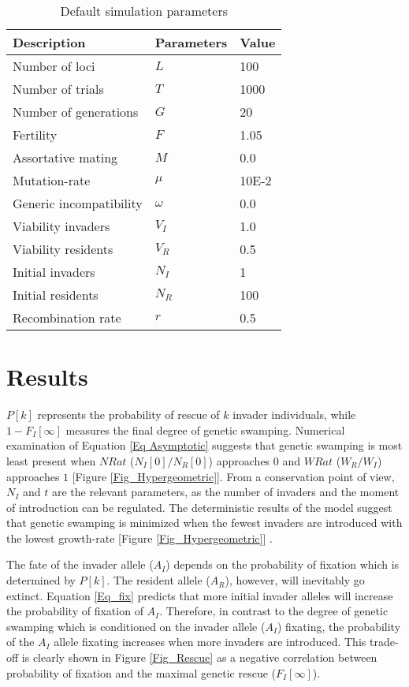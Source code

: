 \documentclass[a4paper,10pt]{article}
\begin{document}
	\begin{table}[]
		\centering
		\caption{Default simulation parameters}
		\label{Table_ParamSim}
		\begin{tabular}{lll}
			\textbf{Description}	& \textbf{Parameters}		& \textbf{Value} 	\\ \hline
			Number of loci 			& $L$			& 100 		\\ 
			Number of trials 		& $T$ 			& 1000		\\
			Number of generations 	& $G$			& 20		\\ 
			Fertility 				& $F$ 			& 1.05  	\\ \hline
			Assortative mating		& $M$ 			& 0.0 		\\  
			Mutation-rate 			& $\mu$			& 10E-2		\\
			Generic incompatibility	& $\omega$ 		& 0.0		\\
			Viability invaders		& $V_I$			& 1.0		\\
			Viability residents		& $V_R$			& 0.5 		\\
			Initial invaders		& $N_I$			& 1 		\\
			Initial residents		& $N_R$			& 100 		\\
			Recombination rate		& $r$ 			& 0.5 		\\
			
		\end{tabular}
	\end{table}

	\section*{Results}
	
	$P[k]$ represents the probability of rescue of $k$ invader individuals, while $1-F_I[\infty]$ measures the final degree of genetic swamping. Numerical examination of Equation \ref{Eq Asymptotic} suggests that genetic swamping is most least present when $NRat$ ($N_I[0]/N_R[0]$) approaches $0$ and $WRat$ ($W_R/W_I$) approaches $1$ [Figure \ref{Fig_Hypergeometric}]. From a conservation point of view, $N_I$ and $t$ are the relevant parameters, as the number of invaders and the moment of introduction can be regulated. The deterministic results of the model suggest that genetic swamping is minimized when the fewest invaders are introduced with the lowest growth-rate [Figure \ref{Fig_Hypergeometric}] . 
	
	The fate of the invader allele ($A_I$) depends on the probability of fixation which is determined by $P[k]$. The resident allele ($A_R$), however, will inevitably go extinct. Equation \ref{Eq_fix} predicts that more initial invader alleles will increase the probability of fixation of $A_I$. Therefore, in contrast to the degree of genetic swamping which is conditioned on the invader allele ($A_I$) fixating, the probability of the $A_I$ allele fixating increases when more invaders are introduced. This trade-off is clearly shown in Figure \ref{Fig_Rescue} as a negative correlation between probability of fixation and the maximal genetic rescue ($F_I[\infty]$).  
	
\end{document}
